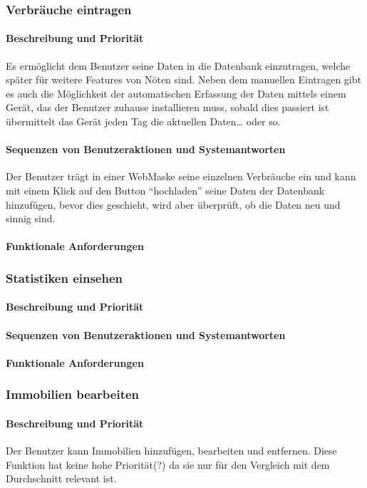 \subsubsection{Verbräuche eintragen}
\paragraph{Beschreibung und Priorität}
Es ermöglicht dem Benutzer seine Daten in die Datenbank einzutragen, welche später für weitere Features von Nöten sind. Neben dem manuellen Eintragen gibt es auch die Möglichkeit der automatischen Erfassung der Daten mittels einem Gerät, das der Benutzer zuhause installieren muss, sobald dies passiert ist übermittelt das Gerät jeden Tag die aktuellen Daten… oder so.

\paragraph{Sequenzen von Benutzeraktionen und Systemantworten}
Der Benutzer trägt in einer WebMaske seine einzelnen Verbräuche ein und kann mit einem Klick auf den Button “hochladen” seine Daten der Datenbank hinzufügen, bevor dies geschieht, wird aber überprüft, ob die Daten neu und sinnig sind.
\paragraph{Funktionale Anforderungen}

\subsubsection{Statistiken einsehen}
\paragraph{Beschreibung und Priorität}
\paragraph{Sequenzen von Benutzeraktionen und Systemantworten}
\paragraph{Funktionale Anforderungen}

\subsubsection{Immobilien bearbeiten}
\paragraph{Beschreibung und Priorität}
Der Benutzer kann Immobilien hinzufügen,
bearbeiten und entfernen. %
Diese Funktion hat keine hohe Priorität(?) da sie nur für den Vergleich mit dem Durchschnitt relevant ist. 
